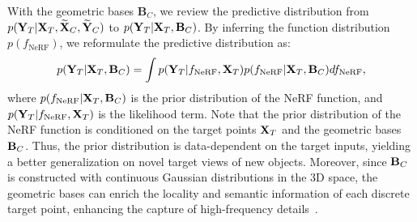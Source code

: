 With the geometric bases $\mathbf{B}_C$, we review the predictive distribution from  $p({\bf{Y}}_{T}| {\bf{X}}_{T}, {\bf{\widetilde{X}}}_{C}, {\bf{\widetilde{Y}}}_{C})$ to $p({\bf{Y}}_{T}| {\bf{X}}_{T},{\bf{{B}}}_{C})$.  By inferring the function distribution $p(f_{\text{NeRF}})$, we reformulate the predictive distribution as: 
\begin{equation}
    p({\bf{{Y}}}_{T} | {\bf{{X}}}_{T}, {\bf{{B}}}_{C}) = \int p({\bf{Y}}_{T}|f_{\text{NeRF}}, {\bf{X}}_{T}) p(f_{\text{NeRF}}| {\bf{X}}_{T}, {\bf{B}}_{C}) df_{\text{NeRF}},
\label{eq: predictive_w_B}
\end{equation}
where $p(f_{\text{NeRF}}| {\bf{X}}_{T}, {\bf{B}}_{C})$ is the prior distribution of the NeRF function, and $p({\bf{Y}}_{T}|f_{\text{NeRF}}, {\bf{X}}_{T})$ is the likelihood term. 
Note that the prior distribution of the NeRF function is conditioned on the target points ${\bf{X}}_{T}$ and the geometric bases ${\bf{B}}_{C}$. 
Thus, the prior distribution is data-dependent on the target inputs, yielding a better generalization on novel target views of new objects. 
Moreover, since ${\bf{B}}_{C}$ is constructed with continuous Gaussian distributions in the 3D space, the geometric bases can enrich the locality and semantic information of each discrete target point, enhancing the capture of high-frequency details~\citep{chen2023neurbf,chen2022tensorf,muller2022instant}.



